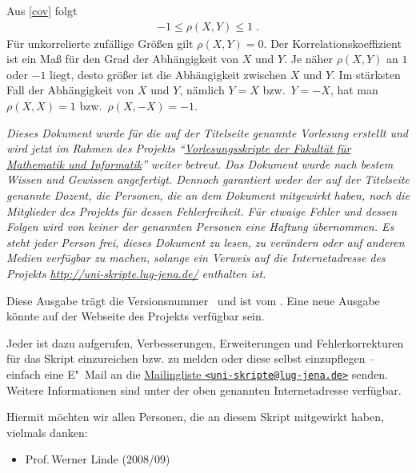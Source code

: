 \documentclass[ngerman,draft,parskip=half,twoside]{scrartcl}
\begin{document}
Aus \autoref{cov} folgt
\begin{gather*}
  -1\le \rho(X,Y)\le 1\;.
\end{gather*}
Für unkorrelierte zufällige Größen gilt $\rho(X,Y)=0$. Der
Korrelationskoeffizient ist ein Maß für den Grad der Abhängigkeit von $X$ und
$Y$. Je näher $\rho(X,Y)$ an $1$ oder $-1$ liegt, desto größer ist die
Abhängigkeit zwischen $X$ und $Y$. Im stärksten Fall der Abhängigkeit von $X$
und $Y$, nämlich $Y=X$ bzw.~$Y=-X$, hat man $\rho(X,X)=1$ bzw.~$\rho(X,-X)=-1$.

\appendix
\clearpage
{}

{\itshape
  Dieses Dokument wurde für die auf der Titelseite genannte Vorlesung erstellt
  und wird jetzt im Rahmen des Projekts
  \enquote{\href{http://uni-skripte.lug-jena.de/}{Vorlesungsskripte der
  Fakultät für Mathematik und Informatik}} weiter betreut. Das Dokument wurde
  nach bestem Wissen und Gewissen angefertigt. Dennoch garantiert weder der auf
  der Titelseite genannte Dozent, die Personen, die an dem Dokument mitgewirkt
  haben, noch die Mitglieder des Projekts für dessen Fehlerfreiheit. Für
  etwaige Fehler und dessen Folgen wird von keiner der genannten Personen eine
  Haftung übernommen. Es steht jeder Person frei, dieses Dokument zu lesen, zu
  verändern oder auf anderen Medien verfügbar zu machen, solange ein Verweis
  auf die Internetadresse des Projekts \url{http://uni-skripte.lug-jena.de/}
  enthalten ist.

  Diese Ausgabe trägt die Versionsnummer~\SVNLastChangedRevision{} und ist vom
  \SVNDate{}. Eine neue Ausgabe könnte auf der Webseite des Projekts verfügbar
  sein.

  Jeder ist dazu aufgerufen, Verbesserungen, Erweiterungen und
  Fehlerkorrekturen für das Skript einzureichen bzw. zu melden oder diese
  selbst einzupflegen -- einfach eine E"~Mail an die
  \href{mailto:uni-skripte@lug-jena.de}{Mailingliste
  \nolinkurl{<uni-skripte@lug-jena.de>}} senden. Weitere Informationen sind
  unter der oben genannten Internetadresse verfügbar.

  Hiermit möchten wir allen Personen, die an diesem Skript mitgewirkt haben,
  vielmals danken:
  \begin{itemize}
   \item Prof.\,Werner Linde (2008/09)
  \end{itemize}
}

\clearpage
{}
\printindex
\end{document}
